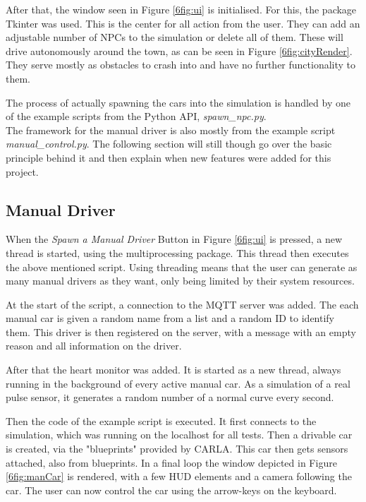 \noindent
After that, the window seen in Figure \ref{6fig:ui} is initialised.
For this, the package Tkinter was used.
This is the center for all action from the user.
They can add an adjustable number of NPCs to the simulation or delete all of them. 
These will drive autonomously around the town, as can be seen in Figure \ref{6fig:cityRender}.
They serve mostly as obstacles to crash into and have no further functionality to them.

\noindent
The process of actually spawning the cars into the simulation
is handled by one of the example scripts from the Python API,
\emph{spawn\_npc.py}.
\\
\newline
The framework for the manual driver is also mostly 
from the example script \emph{manual\_control.py}.
The following section will still though go over the basic principle behind it
and then explain when new features were added for this project.

\subsection{Manual Driver}\label{6sec:manCar}
\noindent
When the \emph{Spawn a Manual Driver} Button in Figure \ref{6fig:ui} is pressed,
a new thread is started, using the multiprocessing package.
This thread then executes the above mentioned script.
Using threading means that the user can generate as many manual drivers as they want,
only being limited by their system resources.

\noindent
At the start of the script,
a connection to the MQTT server was added.
The each manual car is given a random name from a list 
and a random ID to identify them. 
This driver is then registered on the server,
with a message with an empty reason and all information on the driver.

\noindent
After that the heart monitor was added.
It is started as a new thread, always running in the background 
of every active manual car. 
As a simulation of a real pulse sensor,
it generates a random number of a normal curve every second.

Then the code of the example script is executed. 
It first connects to the simulation,
which was running on the localhost for all tests.
Then a drivable car is created, via the "blueprints" provided by CARLA.
This car then gets sensors attached, also from blueprints.
In a final loop the window depicted in Figure \ref{6fig:manCar} is rendered,
with a few HUD elements and a camera following the car. 
The user can now control the car using the arrow-keys on the keyboard.

